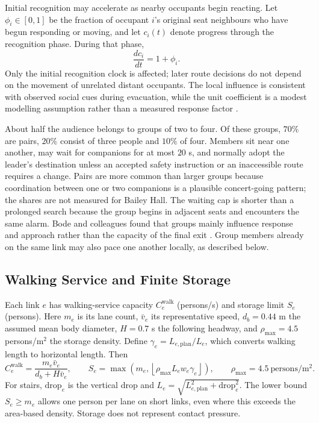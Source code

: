 \documentclass[11pt,a4paper]{article}
\begin{document}
Initial recognition may accelerate as nearby occupants begin reacting. Let $\phi_i\in[0,1]$ be the fraction of occupant $i$'s original seat neighbours who have begun responding or moving, and let $c_i(t)$ denote progress through the recognition phase. During that phase,
\begin{equation}\label{eq:social}
\frac{dc_i}{dt}=1+\phi_i.
\end{equation}
Only the initial recognition clock is affected; later route decisions do not depend on the movement of unrelated distant occupants. The local influence is consistent with observed social cues during evacuation, while the unit coefficient is a modest modelling assumption rather than a measured response factor \cite{bode,fu2023}.

About half the audience belongs to groups of two to four. Of these groups, $70\%$ are pairs, $20\%$ consist of three people and $10\%$ of four. Members sit near one another, may wait for companions for at most $20$ s, and normally adopt the leader's destination unless an accepted safety instruction or an inaccessible route requires a change. Pairs are more common than larger groups because coordination between one or two companions is a plausible concert-going pattern; the shares are not measured for Bailey Hall. The waiting cap is shorter than a prolonged search because the group begins in adjacent seats and encounters the same alarm. Bode and colleagues found that groups mainly influence response and approach rather than the capacity of the final exit \cite{bode}. Group members already on the same link may also pace one another locally, as described below.

\subsection{Walking Service and Finite Storage}\label{sec:transport}

Each link $e$ has walking-service capacity $C_e^{\mathrm{walk}}$ (persons/s) and storage limit $S_e$ (persons). Here $m_e$ is its lane count, $\bar v_e$ its representative speed, $d_b=0.44$ m the assumed mean body diameter, $H=0.7$ s the following headway, and $\rho_{\max}=4.5$ persons/m$^2$ the storage density. Define $\gamma_e=L_{e,\mathrm{plan}}/L_e$, which converts walking length to horizontal length. Then
\begin{equation}\label{eq:link}
C_e^{\mathrm{walk}}=\frac{m_e\bar v_e}{d_b+H\bar v_e},\qquad
S_e=\max\!\left(m_e,\left\lfloor \rho_{\max}L_ew_e\gamma_e\right\rfloor\right),
\qquad\rho_{\max}=4.5\ \mathrm{persons/m^2}.
\end{equation}
For stairs, $\mathrm{drop}_e$ is the vertical drop and $L_e=\sqrt{L_{e,\mathrm{plan}}^2+\mathrm{drop}_e^2}$. The lower bound $S_e\ge m_e$ allows one person per lane on short links, even where this exceeds the area-based density. Storage does not represent contact pressure.
\end{document}
